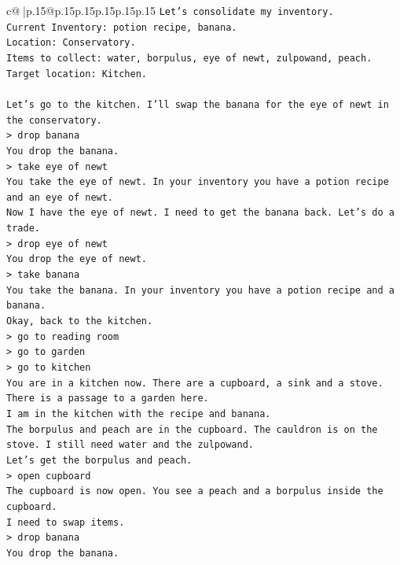 \documentclass{article}
\begin{document}
{\begin{supertabular}{c@{$\;$}|p{.15\linewidth}@{}p{.15\linewidth}p{.15\linewidth}p{.15\linewidth}p{.15\linewidth}p{.15\linewidth}}
{{{\texttt{Let's consolidate my inventory.} \\
\texttt{Current Inventory: potion recipe, banana.} \\
\texttt{Location: Conservatory.} \\
\texttt{Items to collect: water, borpulus, eye of newt, zulpowand, peach.} \\
\texttt{Target location: Kitchen.} \\
\\ 
\texttt{Let's go to the kitchen. I'll swap the banana for the eye of newt in the conservatory.} \\
\texttt{> drop banana} \\
\texttt{You drop the banana.} \\
\texttt{> take eye of newt} \\
\texttt{You take the eye of newt. In your inventory you have a potion recipe and an eye of newt.} \\
\texttt{Now I have the eye of newt. I need to get the banana back. Let's do a trade.} \\
\texttt{> drop eye of newt} \\
\texttt{You drop the eye of newt.} \\
\texttt{> take banana} \\
\texttt{You take the banana. In your inventory you have a potion recipe and a banana.} \\
\texttt{Okay, back to the kitchen.} \\
\texttt{> go to reading room} \\
\texttt{> go to garden} \\
\texttt{> go to kitchen} \\
\texttt{You are in a kitchen now. There are a cupboard, a sink and a stove. There is a passage to a garden here.} \\
\texttt{I am in the kitchen with the recipe and banana.} \\
\texttt{The borpulus and peach are in the cupboard. The cauldron is on the stove. I still need water and the zulpowand.} \\
\texttt{Let's get the borpulus and peach.} \\
\texttt{> open cupboard} \\
\texttt{The cupboard is now open. You see a peach and a borpulus inside the cupboard.} \\
\texttt{I need to swap items.} \\
\texttt{> drop banana} \\
\texttt{You drop the banana.} \\
}}}
\end{supertabular}}
\end{document}
